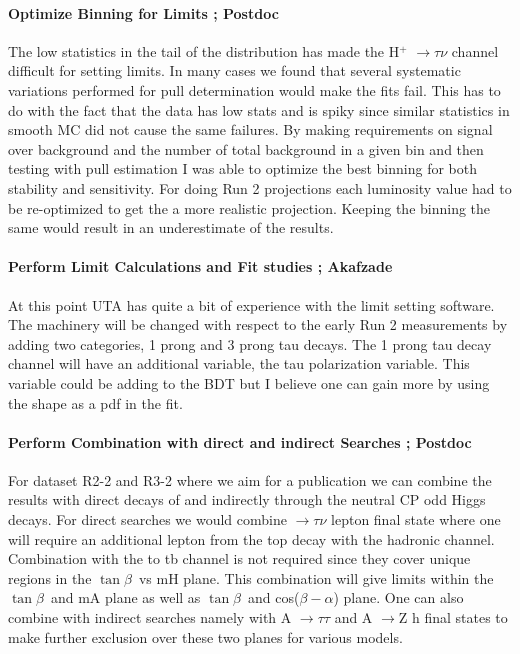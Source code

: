 \documentclass[11pt]{article}
\newcommand{\tanb}{$\tan \beta$}
\newcommand{\too}{$\rightarrow$}
\begin{document}
\paragraph{Optimize Binning for Limits ;  Postdoc} %
The low statistics in the tail of the distribution has made the H$^+$ \too $\tau \nu$ channel difficult for setting limits.  In many cases we found that several systematic variations performed for pull determination would make the fits fail.  
This has to do with the fact that the data has low stats and is spiky since similar statistics in smooth MC did not cause the same failures.  By making requirements on signal over background and the number of total background in a given
bin and then testing with pull estimation I was able to optimize the best binning for both stability and sensitivity.  For doing Run 2 projections each luminosity value had to be re-optimized to get the a more realistic projection.
Keeping the binning the same would result in an underestimate of the results. 

\paragraph{Perform Limit Calculations and Fit studies ;  Akafzade}%
At this point UTA has quite a bit of experience with the limit setting software. The machinery will be changed with respect to the early Run 2 measurements by adding 
two categories, 1 prong and 3 prong tau decays.  The 1 prong tau decay channel will have an additional variable, the tau polarization variable.  This variable could be adding to the BDT 
but I believe one can gain more by using the shape as a pdf in the fit.

\paragraph{Perform Combination with direct and indirect Searches ;  Postdoc}%
For dataset R2-2 and R3-2 where we aim for a publication we can combine the results with direct decays of \Hp and indirectly through the neutral CP odd Higgs decays.  For direct searches we would combine \Hp \too $\tau \nu $ lepton final state where one will
require an additional lepton from the top decay with the hadronic channel.  Combination with the \Hp to tb channel is not required since they cover unique regions in the \tanb\ vs mH plane. This combination will give limits within the \tanb\ and mA plane as well as \tanb\ and cos($\beta-\alpha$) plane. 
One can also combine with indirect searches namely with A \too $\tau \tau$ and A \too Z h final states to make further exclusion over these two planes for various models.
\end{document}
